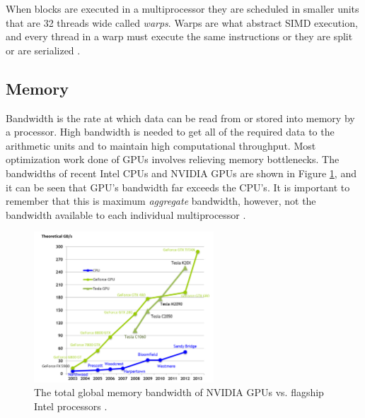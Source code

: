 When blocks are executed in a multiprocessor they are scheduled in smaller units that are 32 threads wide called \emph{warps}.%
  Warps are what abstract SIMD execution, and every thread in a warp must execute the same instructions or they are split or are serialized \cite{cuda}. %

\subsection{Memory}

Bandwidth is the rate at which data can be read from or stored into memory by a processor. High bandwidth is needed to get all of the required data to the arithmetic units and to maintain high computational throughput.  Most optimization work done of GPUs involves relieving memory bottlenecks.  The bandwidths of recent Intel CPUs and NVIDIA GPUs are shown in Figure \ref{bandwidth}, and it can be seen that GPU's bandwidth far exceeds the CPU's.  It is important to remember that this is maximum \emph{aggregate} bandwidth, however, not the bandwidth available to each individual multiprocessor \cite{cuda}.   

\begin{figure}[h!] 
  \centering
    \includegraphics[width=0.6\textwidth]{graphics/memory_bandwidth.pdf}
     \caption[The total global memory bandwidth of NVIDIA GPUs vs.\ flagship Intel processors.]{The total global memory bandwidth of NVIDIA GPUs vs. flagship Intel processors \cite{cuda}. \label{bandwidth}}
\end{figure}

